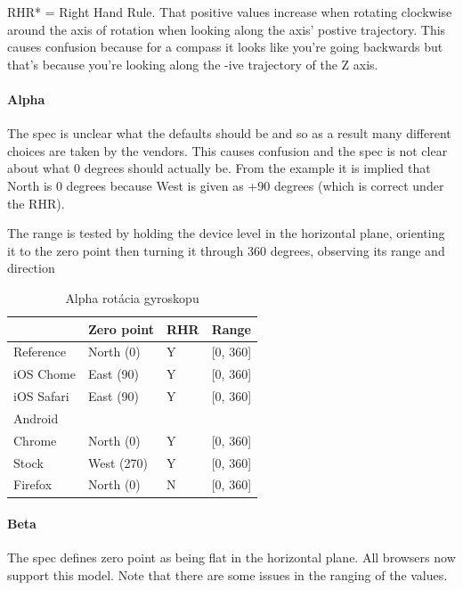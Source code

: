 RHR* = Right Hand Rule. That positive values increase when rotating clockwise
around the axis of rotation when looking along the axis' postive trajectory. This causes confusion because for a compass it looks like you're going backwards but that's because you're looking along the -ive trajectory of the Z axis.

\paragraph{Alpha} %
\label{par:alpha}


The spec is unclear what the defaults should be and so as a result many different choices are taken by the vendors. This causes confusion and the spec is not clear about what 0 degrees should actually be. From the example it is implied that North is 0 degrees because West is given as +90 degrees (which is correct under the RHR).

The range is tested by holding the device level in the horizontal plane, orienting it to the zero point then turning it through 360 degrees, observing its range and direction

\begin{table}[H]
  \begin{tabular}{ | l | l | l | l |}
  \hline
              & Zero point  & RHR   & Range \\ \hline
  Reference   & North (0)   & Y     & [0, 360] \\  
  iOS Chome   & East (90)   & Y     & [0, 360] \\  
  iOS Safari  & East (90)   & Y     & [0, 360] \\  
  Android & & & \\  
  Chrome      & North (0)   & Y     & [0, 360] \\  
  Stock       & West (270)  & Y     & [0, 360] \\  
  Firefox     & North (0)   & N     & [0, 360] \\
  \hline
  \end{tabular}
  \caption[Alpha rotácia gyroskopu]{Alpha rotácia gyroskopu}
\end{table}



\paragraph{Beta} %
\label{par:beta}


The spec defines zero point as being flat in the horizontal plane. All browsers now support this model. Note that there are some issues in the ranging of the values.

